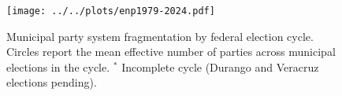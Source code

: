 \documentclass[letter,12pt]{article}
\newcommand{\mc}{\multicolumn}
\begin{document}

\begin{figure}
  \texttt{[image: ../../plots/enp1979-2024.pdf]}
  \caption{Municipal party system fragmentation by federal election cycle. Circles report the mean effective number of parties across municipal elections in the cycle. $^*$ Incomplete cycle (Durango and Veracruz elections pending).}\label{F:enp}
\end{figure}

\end{document}
